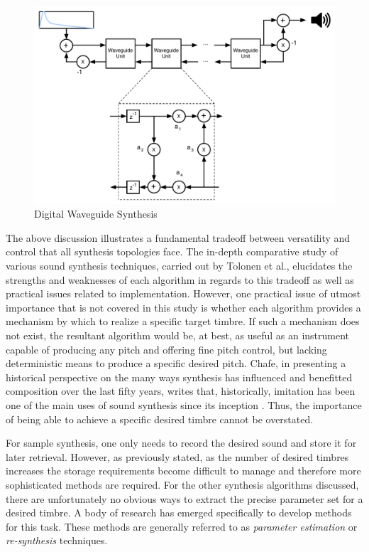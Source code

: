 \documentclass[a4paper,12pt]{report} 	%
\numberwithin{figure}{chapter}
\numberwithin{table}{chapter}
\numberwithin{equation}{chapter}
\begin{document}
\begin{flushleft}
\\
\begin{figure}[h!]
\begin{center}
\includegraphics[scale=0.55]{DigitalWaveguideSynthesis}
\caption[Digital Waveguide Synthesis]{Digital Waveguide Synthesis}
\end{center}
\end{figure}
The above discussion illustrates a fundamental tradeoff between versatility and control that all synthesis topologies face. The in-depth comparative study of various sound synthesis techniques, carried out by Tolonen et al., elucidates the strengths and weaknesses of each algorithm in regards to this tradeoff as well as practical issues related to implementation. However, one practical issue of utmost importance that is not covered in this study is whether each algorithm provides a mechanism by which to realize a specific target timbre. If such a mechanism does not exist, the resultant algorithm would be, at best, as useful as an instrument capable of producing any pitch and offering fine pitch control, but lacking deterministic means to produce a specific desired pitch. Chafe, in presenting a historical perspective on the many ways synthesis has influenced and benefitted composition over the last fifty years, writes that, historically, imitation has been one of the main uses of sound synthesis since its inception \cite[p. 2]{Chafe:1999bx}. Thus, the importance of being able to achieve a specific desired timbre cannot be overstated.

For sample synthesis, one only needs to record the desired sound and store it for later retrieval. However, as previously stated, as the number of desired timbres increases the storage requirements become difficult to manage and therefore more sophisticated methods are required. For the other synthesis algorithms discussed, there are unfortunately no obvious ways to extract the precise parameter set for a desired timbre. A body of research has emerged specifically to develop methods for this task. These methods are generally referred to as \emph{parameter estimation} or \emph{re-synthesis} techniques.


\end{flushleft}
\end{document}
